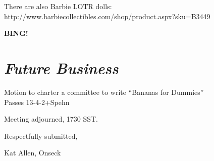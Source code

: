 \documentclass[10pt]{article}
\newcommand{\bing}{{\bf BING!} }
\newcommand{\goto}[1]{\bing \vskip 12pt \section*{{\em{#1}}}}
\begin{document}
There are also Barbie LOTR dolls:\\
http://www.barbiecollectibles.com/shop/product.aspx?sku=B3449
       
\goto{Future Business}

Motion to charter a committee to write ``Bananas for Dummies''\\
Passes 13-4-2+Spehn

\vspace{12pt}

\noindent
Meeting adjourned, 1730 SST.

\vspace{18pt}

\centerline{Respectfully submitted,}
\centerline{Kat Allen,  Onseck}
\end{document}
